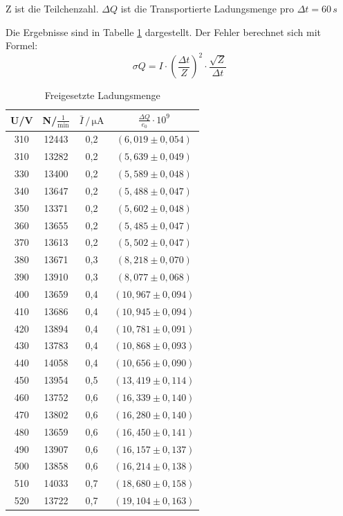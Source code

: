Z ist die Teilchenzahl.
$\Delta Q$ ist die Transportierte Ladungsmenge pro $\Delta t = 60\,s$

Die Ergebnisse sind in Tabelle \ref{tab:Q} dargestellt.
Der Fehler berechnet sich mit Formel:
\begin{equation*}
  \sigma Q =  I \cdot \left(\frac{\Delta t}{Z}\right)^2\cdot \frac{\sqrt{Z}}{\Delta t}
\end{equation*}

\begin{table}
\centering
\caption{Freigesetzte Ladungsmenge}
\label{tab:Q}
\begin{tabular}{c c c c }
\toprule
{U/V} & {N/$\mathrm{\frac{1}{min}}$} & {$\bar{I}\,/\, \mathrm{\mu A}$}  & {$\frac{\Delta Q}{e_0}\cdot 10^9$}\\
\midrule
310 & 12443 & 0,2 & $(6,019\pm 0,054)$ \\
310 & 13282 & 0,2 & $(5,639\pm 0,049)$\\
330 & 13400 & 0,2 & $(5,589\pm 0,048)$\\
340 & 13647 & 0,2 & $(5,488\pm 0,047)$\\
350 & 13371 & 0,2 & $(5,602\pm 0,048)$ \\
360 & 13655 & 0,2 & $(5,485\pm 0,047)$\\
370 & 13613 & 0,2 & $(5,502\pm 0,047)$ \\
380 & 13671 & 0,3 & $(8,218\pm 0,070)$  \\
390 & 13910 & 0,3 & $(8,077\pm 0,068)$ \\
400 & 13659 & 0,4 & $(10,967\pm 0,094)$ \\
410 & 13686 & 0,4 & $(10,945\pm 0,094)$ \\
420 & 13894 & 0,4 & $(10,781\pm 0,091)$ \\
430 & 13783 & 0,4 & $(10,868\pm 0,093)$ \\
440 & 14058 & 0,4 & $(10,656\pm 0,090)$ \\
450 & 13954 & 0,5 & $(13,419\pm 0,114)$ \\
460 & 13752 & 0,6 & $(16,339\pm 0,140)$ \\
470 & 13802 & 0,6 & $(16,280\pm 0,140)$ \\
480 & 13659 & 0,6 & $(16,450\pm 0,141)$ \\
490 & 13907 & 0,6 & $(16,157\pm 0,137)$\\
500 & 13858 & 0,6 & $(16,214\pm 0,138)$ \\
510 & 14033 & 0,7 & $(18,680\pm 0,158)$ \\
520 & 13722 & 0,7 & $(19,104\pm 0,163)$ \\

\end{tabular}
\end{table}
